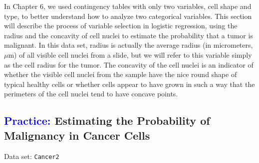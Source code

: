 \documentclass[
]{report}
\begin{document}
In Chapter 6, we used contingency tables with only two variables, cell shape and type, to better understand how to analyze two categorical variables. This section will describe the process of variable selection in logistic regression, using the radius and the concavity of cell nuclei to estimate the probability that a tumor is malignant. In this data set, radius is actually the average radius (in micrometers, \(\scriptstyle \mu\)m) of all visible cell nuclei from a slide, but we will refer to this variable simply as the cell radius for the tumor. The concavity of the cell nuclei is an indicator of whether the visible cell nuclei from the sample have the nice round shape of typical healthy cells or whether cells appear to have grown in such a way that the perimeters of the cell nuclei tend to have concave points.

\hypertarget{estimating-the-probability-of-malignancy-in-cancer-cells}{%
\subsection*{\texorpdfstring{\textcolor{blue}{Practice:} Estimating the Probability of Malignancy in Cancer Cells}{ Estimating the Probability of Malignancy in Cancer Cells}}\label{estimating-the-probability-of-malignancy-in-cancer-cells}}

\vspace{-1em}

Data set: \texttt{Cancer2}
\end{document}

